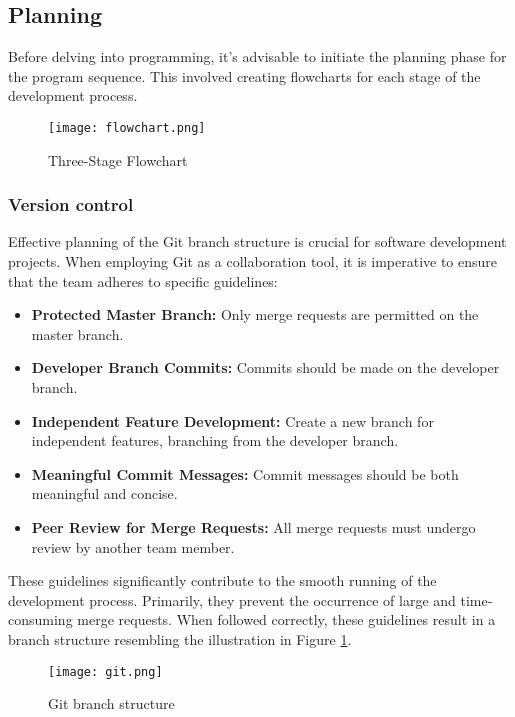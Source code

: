 \documentclass[../report.tex]{subfiles}
\begin{document}
    \subsection{Planning}
    Before delving into programming, it's advisable to initiate the planning
    phase for the program sequence. This involved creating flowcharts for each
    stage of the development process.

    
    \begin{figure}[H]
        \centering
        \texttt{[image: flowchart.png]}
        \caption{Three-Stage Flowchart}
    \end{figure}

    \subsubsection{Version control}
    Effective planning of the Git branch structure is crucial for software
    development projects. When employing Git as a collaboration tool, it is
    imperative to ensure that the team adheres to specific guidelines:
    \begin{itemize}
        \item \textbf{Protected Master Branch:} Only merge requests are permitted on the master branch.
        \item \textbf{Developer Branch Commits:} Commits should be made on the developer branch.
        \item \textbf{Independent Feature Development:} Create a new branch for independent features, branching from the developer branch.
        \item \textbf{Meaningful Commit Messages:} Commit messages should be both meaningful and concise.
        \item \textbf{Peer Review for Merge Requests:} All merge requests must undergo review by another team member.
    \end{itemize}
    These guidelines significantly contribute to the smooth running of the
    development process. Primarily, they prevent the occurrence of large and
    time-consuming merge requests. When followed correctly, these guidelines
    result in a branch structure resembling the illustration in Figure
    \ref{fig:git}.
    \begin{figure}[H]
        \centering
        \texttt{[image: git.png]}
        \caption{Git branch structure}
        \label{fig:git}
    \end{figure}
\end{document}
